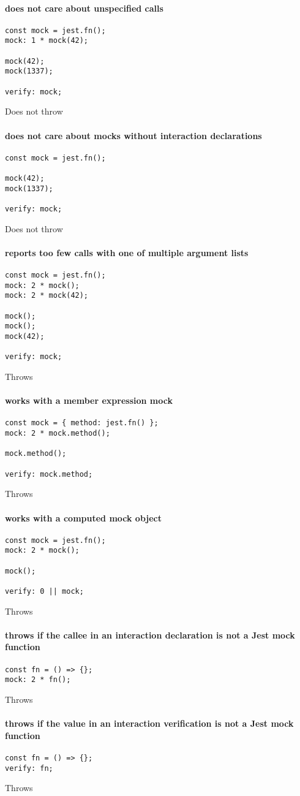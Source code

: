 \paragraph*{does not care about unspecified calls}
\begin{verbatim}
const mock = jest.fn();
mock: 1 * mock(42);

mock(42);
mock(1337);

verify: mock;
\end{verbatim}
Does not throw
\paragraph*{does not care about mocks without interaction declarations}
\begin{verbatim}
const mock = jest.fn();

mock(42);
mock(1337);

verify: mock;
\end{verbatim}
Does not throw
\paragraph*{reports too few calls with one of multiple argument lists}
\begin{verbatim}
const mock = jest.fn();
mock: 2 * mock();
mock: 2 * mock(42);

mock();
mock();
mock(42);

verify: mock;
\end{verbatim}
Throws
\paragraph*{works with a member expression mock}
\begin{verbatim}
const mock = { method: jest.fn() };
mock: 2 * mock.method();

mock.method();

verify: mock.method;
\end{verbatim}
Throws
\paragraph*{works with a computed mock object}
\begin{verbatim}
const mock = jest.fn();
mock: 2 * mock();

mock();

verify: 0 || mock;
\end{verbatim}
Throws
\paragraph*{throws if the callee in an interaction declaration is not a Jest mock function}
\begin{verbatim}
const fn = () => {};
mock: 2 * fn();
\end{verbatim}
Throws
\paragraph*{throws if the value in an interaction verification is not a Jest mock function}
\begin{verbatim}
const fn = () => {};
verify: fn;
\end{verbatim}
Throws
